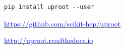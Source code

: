 \documentclass[aspectratio=169]{beamer}
\begin{document}
\begin{frame}[fragile]{}
\vspace{0.5 cm}
\huge
\begin{center}
\begin{minipage}{0.8\linewidth}
\begin{verbatim}
pip install uproot --user
\end{verbatim}
\end{minipage}

\Large
\vspace{1 cm}
\href{https://github.com/scikit-hep/uproot}{\textcolor{blue}{https://github.com/scikit-hep/uproot}}

\vspace{0.5 cm}
\href{http://uproot.readthedocs.io}{\textcolor{blue}{http://uproot.readthedocs.io}}
\end{center}
\end{frame}
\end{document}
